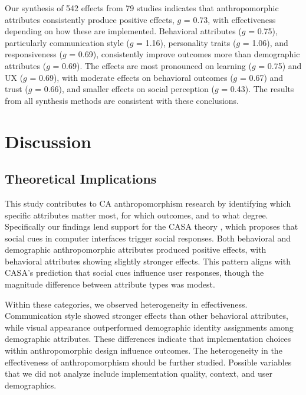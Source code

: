 \documentclass[manuscript,screen,review,anonymous]{acmart}
\begin{document}
Our synthesis of 542 effects from 79 studies indicates that anthropomorphic attributes consistently produce positive effects, $g$ = 0.73, with effectiveness depending on how these are implemented. Behavioral attributes ($g$ = 0.75), particularly communication style ($g$ = 1.16), personality traits ($g$ = 1.06), and responsiveness ($g$ = 0.69), consistently improve outcomes more than demographic attributes ($g$ = 0.69). The effects are most pronounced on learning ($g$ = 0.75) and UX ($g$ = 0.69), with moderate effects on behavioral outcomes ($g$ = 0.67) and trust ($g$ = 0.66), and smaller effects on social perception ($g$ = 0.43). The results from all synthesis methods are consistent with these conclusions. %

\section{Discussion}


\subsection{Theoretical Implications}

This study contributes to CA anthropomorphism research by identifying which specific attributes matter most, for which outcomes, and to what degree. Specifically our findings lend support for the CASA theory \citep{nass1997machines}, which proposes that social cues in computer interfaces trigger social responses. Both behavioral and demographic anthropomorphic attributes produced positive effects, with behavioral attributes showing slightly stronger effects. This pattern aligns with CASA's prediction that social cues influence user responses, though the magnitude difference between attribute types was modest.

Within these categories, we observed heterogeneity in effectiveness. Communication style showed stronger effects than other behavioral attributes, while visual appearance outperformed demographic identity assignments among demographic attributes. These differences indicate that implementation choices within anthropomorphic design influence outcomes. The heterogeneity in the effectiveness of anthropomorphism should be further studied. Possible variables that we did not analyze include implementation quality, context, and user demographics.
\end{document}
